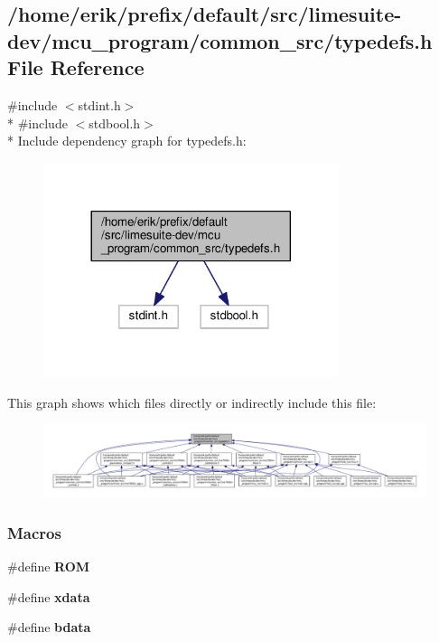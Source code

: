 \subsection{/home/erik/prefix/default/src/limesuite-\/dev/mcu\+\_\+program/common\+\_\+src/typedefs.h File Reference}
\label{typedefs_8h}
{\ttfamily \#include $<$stdint.\+h$>$}\\*
{\ttfamily \#include $<$stdbool.\+h$>$}\\*
Include dependency graph for typedefs.\+h\+:
\nopagebreak
\begin{figure}[H]
\begin{center}
\leavevmode
\includegraphics[width=245pt]{d4/d1e/typedefs_8h__incl}
\end{center}
\end{figure}
This graph shows which files directly or indirectly include this file\+:
\nopagebreak
\begin{figure}[H]
\begin{center}
\leavevmode
\includegraphics[width=350pt]{d0/dc5/typedefs_8h__dep__incl}
\end{center}
\end{figure}
\subsubsection*{Macros}
\begin{DoxyCompactItemize}
\item 
\#define {\bf R\+OM}
\item 
\#define {\bf xdata}
\item 
\#define {\bf bdata}
\end{DoxyCompactItemize}
